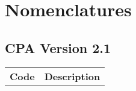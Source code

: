 \chapter{Nomenclatures}

\listoftables
\listoffigures

\pagebreak
\section{CPA Version 2.1}

\begin{tabular}{l|c}%
    \bfseries Code & \bfseries Description%
\end{tabular}

% 

% 
